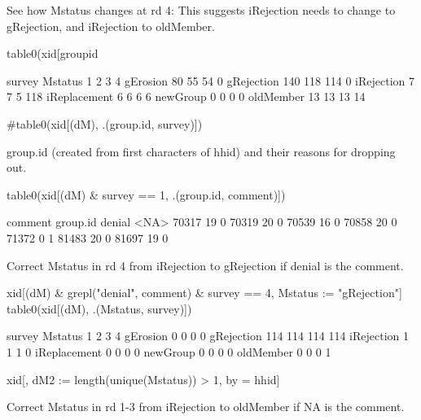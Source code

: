 See how \textsf{Mstatus} changes at rd 4: This suggests \textsf{iRejection} needs to change to \textsf{gRejection}, and \textsf{iRejection} to \textsf{oldMember}.
\begin{Schunk}
\begin{Sinput}
table0(xid[groupid %in% groupid[(dM)], .(Mstatus, survey)])
\end{Sinput}
\begin{Soutput}
              survey
Mstatus          1   2   3   4
  gErosion      80  55  54   0
  gRejection   140 118 114   0
  iRejection     7   7   5 118
  iReplacement   6   6   6   6
  newGroup       0   0   0   0
  oldMember     13  13  13  14
\end{Soutput}
\begin{Sinput}
#table0(xid[(dM), .(group.id, survey)])
\end{Sinput}
\end{Schunk}
\textsf{group.id} (created from first characters of \textsf{hhid}) and their reasons for dropping out.
\begin{Schunk}
\begin{Sinput}
table0(xid[(dM) & survey == 1, .(group.id, comment)])
\end{Sinput}
\begin{Soutput}
        comment
group.id denial <NA>
   70317     19    0
   70319     20    0
   70539     16    0
   70858     20    0
   71372      0    1
   81483     20    0
   81697     19    0
\end{Soutput}
\end{Schunk}
Correct \textsf{Mstatus} in rd 4 from \textsf{iRejection} to \textsf{gRejection} if denial is the \textsf{comment}. \gobblepars
\begin{Schunk}
\begin{Sinput}
xid[(dM) & grepl("denial", comment) & survey == 4, Mstatus := "gRejection"]
table0(xid[(dM), .(Mstatus, survey)])
\end{Sinput}
\begin{Soutput}
              survey
Mstatus          1   2   3   4
  gErosion       0   0   0   0
  gRejection   114 114 114 114
  iRejection     1   1   1   0
  iReplacement   0   0   0   0
  newGroup       0   0   0   0
  oldMember      0   0   0   1
\end{Soutput}
\begin{Sinput}
xid[, dM2 := length(unique(Mstatus)) > 1, by = hhid]
\end{Sinput}
\end{Schunk}
Correct \textsf{Mstatus} in rd 1-3 from \textsf{iRejection} to \textsf{oldMember} if NA is the \textsf{comment}. \gobblepars
